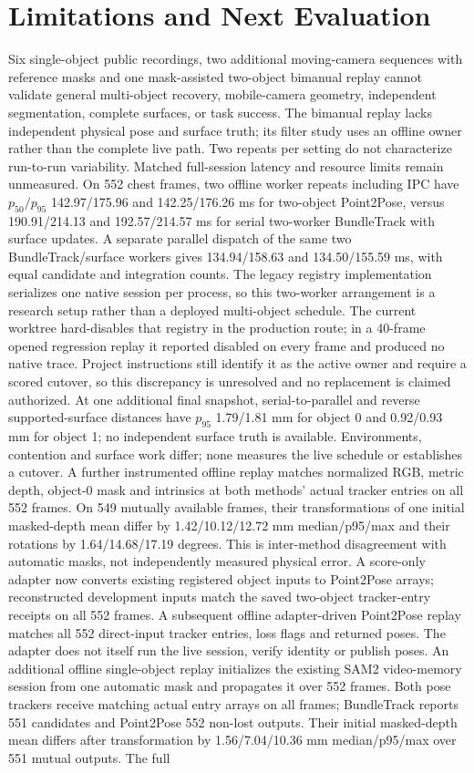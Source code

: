 \documentclass[10pt,journal]{IEEEtran}
\begin{document}
\section{Limitations and Next Evaluation}
Six single-object public recordings, two additional moving-camera sequences with reference masks and one mask-assisted two-object bimanual replay cannot validate general multi-object recovery, mobile-camera geometry, independent segmentation, complete surfaces, or task success. The bimanual replay lacks independent physical pose and surface truth; its filter study uses an offline owner rather than the complete live path. Two repeats per setting do not characterize run-to-run variability. Matched full-session latency and resource limits remain unmeasured. On 552 chest frames, two offline worker repeats including IPC have $p_{50}/p_{95}$ 142.97/175.96 and 142.25/176.26 ms for two-object Point2Pose, versus 190.91/214.13 and 192.57/214.57 ms for serial two-worker BundleTrack with surface updates. A separate parallel dispatch of the same two BundleTrack/surface workers gives 134.94/158.63 and 134.50/155.59 ms, with equal candidate and integration counts. The legacy registry implementation serializes one native session per process, so this two-worker arrangement is a research setup rather than a deployed multi-object schedule. The current worktree hard-disables that registry in the production route; in a 40-frame opened regression replay it reported disabled on every frame and produced no native trace. Project instructions still identify it as the active owner and require a scored cutover, so this discrepancy is unresolved and no replacement is claimed authorized. At one additional final snapshot, serial-to-parallel and reverse supported-surface distances have $p_{95}$ 1.79/1.81 mm for object 0 and 0.92/0.93 mm for object 1; no independent surface truth is available. Environments, contention and surface work differ; none measures the live schedule or establishes a cutover. A further instrumented offline replay matches normalized RGB, metric depth, object-0 mask and intrinsics at both methods' actual tracker entries on all 552 frames. On 549 mutually available frames, their transformations of one initial masked-depth mean differ by 1.42/10.12/12.72 mm median/p95/max and their rotations by 1.64/14.68/17.19 degrees. This is inter-method disagreement with automatic masks, not independently measured physical error. A score-only adapter now converts existing registered object inputs to Point2Pose arrays; reconstructed development inputs match the saved two-object tracker-entry receipts on all 552 frames. A subsequent offline adapter-driven Point2Pose replay matches all 552 direct-input tracker entries, loss flags and returned poses. The adapter does not itself run the live session, verify identity or publish poses. An additional offline single-object replay initializes the existing SAM2 video-memory session from one automatic mask and propagates it over 552 frames. Both pose trackers receive matching actual entry arrays on all frames; BundleTrack reports 551 candidates and Point2Pose 552 non-lost outputs. Their initial masked-depth mean differs after transformation by 1.56/7.04/10.36 mm median/p95/max over 551 mutual outputs. The full 
\end{document}
